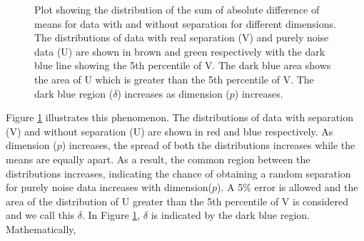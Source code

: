 \begin{figure}[hbtp]
   \centering
       \caption{Plot showing the distribution of the sum of absolute difference of means for data with and without separation for different dimensions. The distributions of data with real separation (V) and purely noise data (U) are shown in brown and green respectively with the dark blue line showing the 5th percentile of V. The dark blue area shows the area of U which is greater than the 5th percentile of V. The dark blue region ($\delta$) increases as dimension ($p$) increases. }
     \label{fig:dimen}
\end{figure}


Figure \ref{fig:dimen} illustrates this phenomenon. The distributions of data with separation (V) and without separation (U) are shown in red and blue respectively. As dimension ($p$) increases, the spread of both the distributions increases while the means are equally apart. As a result, the common region between the distributions increases, indicating the chance of obtaining a random separation for purely noise data increases with dimension($p$). A 5\% error is allowed and the area of the distribution of U greater than the 5th percentile of V is considered and we call this $\delta$. In Figure \ref{fig:dimen}, $\delta$ is indicated by the dark blue region. Mathematically, 

